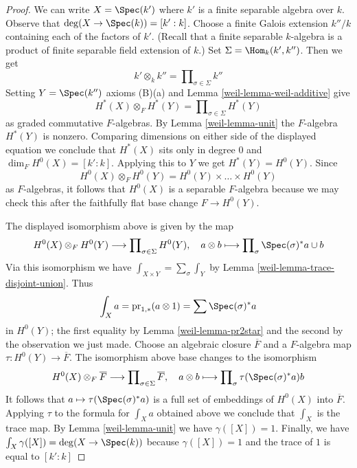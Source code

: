 \begin{proof}

We can write $X = \Spec(k')$ where $k'$ is a finite separable
algebra over $k$. Observe that $\deg(X \to \Spec(k)) = [k' : k]$.
Choose a finite Galois extension $k''/k$ containing each of the
factors of $k'$. (Recall that a finite separable $k$-algebra is
a product of finite separable field extension of $k$.)
Set $\Sigma = \Hom_k(k', k'')$. Then we get
$$
k' \otimes_k k'' = \prod\nolimits_{\sigma \in \Sigma} k''
$$
Setting $Y = \Spec(k'')$ axioms (B)(a) and Lemma \ref{weil-lemma-weil-additive} give
$$
H^*(X) \otimes_F H^*(Y) =
\prod\nolimits_{\sigma \in \Sigma} H^*(Y)
$$
as graded commutative $F$-algebras. By Lemma \ref{weil-lemma-unit} the
$F$-algebra $H^*(Y)$ is nonzero. Comparing dimensions on either side
of the displayed equation we conclude that $H^*(X)$ sits only in degree $0$
and $\dim_F H^0(X) = [k' : k]$. Applying this to $Y$ we get
$H^*(Y) = H^0(Y)$. Since
$$
H^0(X) \otimes_F H^0(Y) = H^0(Y) \times \ldots \times H^0(Y)
$$
as $F$-algebras, it follows that $H^0(X)$ is a separable $F$-algebra
because we may check this after the faithfully flat base change
$F \to H^0(Y)$.

\medskip\noindent
The displayed isomorphism above is given by the map
$$
H^0(X) \otimes_F H^0(Y) \longrightarrow
\prod\nolimits_{\sigma \in \Sigma} H^0(Y),\quad
a \otimes b \longmapsto \prod\nolimits_\sigma \Spec(\sigma)^*a \cup b
$$
Via this isomorphism we have $\int_{X \times Y} = \sum_\sigma \int_Y$ by
Lemma \ref{weil-lemma-trace-disjoint-union}. Thus
$$
\int_X a = \text{pr}_{1, *}(a \otimes 1) = \sum \Spec(\sigma)^*a
$$
in $H^0(Y)$; the first equality by Lemma \ref{weil-lemma-pr2star}
and the second by the observation we just made. Choose an
algebraic closure $\overline{F}$ and
a $F$-algebra map $\tau : H^0(Y) \to \overline{F}$.
The isomorphism above base changes to the isomorphism
$$
H^0(X) \otimes_F \overline{F} \longrightarrow
\prod\nolimits_{\sigma \in \Sigma} \overline{F},\quad
a \otimes b \longmapsto \prod\nolimits_\sigma \tau(\Spec(\sigma)^*a) b
$$
It follows that $a \mapsto \tau(\Spec(\sigma)^*a)$ is a full set
of embeddings of $H^0(X)$ into $\overline{F}$. Applying $\tau$
to the formula for $\int_X a$ obtained above we conclude
that $\int_X$ is the trace map.
By Lemma \ref{weil-lemma-unit} we have $\gamma([X]) = 1$.
Finally, we have $\int_X \gamma([X]) = \deg(X \to \Spec(k))$
because $\gamma([X]) = 1$ and the trace of $1$ is equal to $[k' : k]$
\end{proof}

